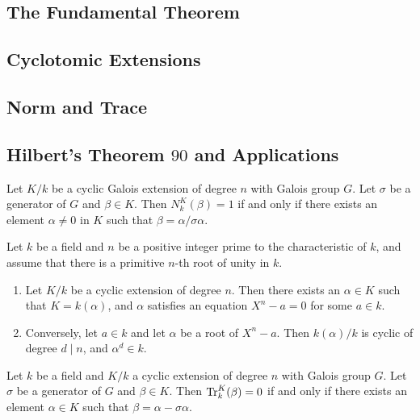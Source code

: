 \subsection{The Fundamental Theorem}

\subsection{Cyclotomic Extensions}

\subsection{Norm and Trace}

\subsection{Hilbert's Theorem \texorpdfstring{$90$}{90} and Applications}

\begin{theorem}
    Let $K/k$ be a cyclic Galois extension of degree $n$ with Galois group $G$. Let $\sigma$ be a generator of $G$ and $\beta\in K$. Then $N^K_k(\beta) = 1$ if and only if there exists an element $\alpha\ne 0$ in $K$ such that $\beta = \alpha/\sigma\alpha$.
\end{theorem}

\begin{proposition}
    Let $k$ be a field and $n$ be a positive integer prime to the characteristic of $k$, and assume that there is a primitive $n$-th root of unity in $k$. 
    \begin{enumerate}[label=(\arabic*)]
        \item Let $K/k$ be a cyclic extension of degree $n$. Then there exists an $\alpha\in K$ such that $K = k(\alpha)$, and $\alpha$ satisfies an equation $X^n - a = 0$ for some $a\in k$. 
        \item Conversely, let $a\in k$ and let $\alpha$ be a root of $X^n - a$. Then $k(\alpha)/k$ is cyclic of degree $d\mid n$, and $\alpha^d\in k$.
    \end{enumerate}
\end{proposition}

\begin{theorem}
    Let $k$ be a field and $K/k$ a cyclic extension of degree $n$ with Galois group $G$. Let $\sigma$ be a generator of $G$ and $\beta\in K$. Then $\operatorname{Tr}^K_k(\beta) = 0$ if and only if there exists an element $\alpha\in K$ such that $\beta = \alpha - \sigma\alpha$.
\end{theorem}

